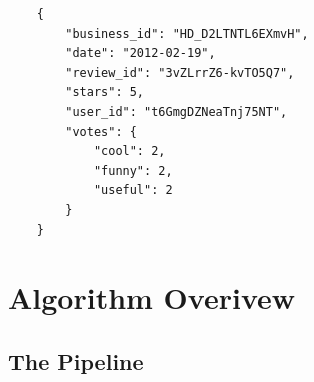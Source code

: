 \documentclass[10pt,twocolumn,letterpaper]{article}
\begin{document}
\begin{verbatim}
	{
	    "business_id": "HD_D2LTNTL6EXmvH",
	    "date": "2012-02-19",
	    "review_id": "3vZLrrZ6-kvTO5Q7",
	    "stars": 5,
	    "user_id": "t6GmgDZNeaTnj75NT",
	    "votes": {
	        "cool": 2,
	        "funny": 2,
	        "useful": 2
	    }
	}
\end{verbatim}

\section{Algorithm Overivew}
\subsection{The Pipeline}
\begin{figure}[t]
\begin{center}

\end{center}
\end{figure}
\end{document}
